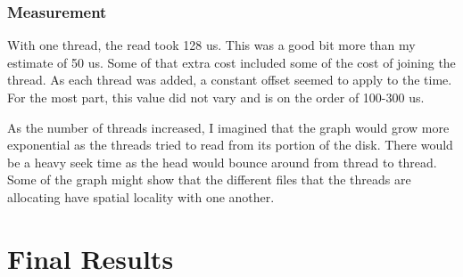 \documentclass[paper=a4, fontsize=11pt]{scrartcl}
\numberwithin{equation}{section}        %
\numberwithin{figure}{section}          %
\numberwithin{table}{section}               %
\begin{document}
\subsubsection{Measurement}

With one thread, the read took 128 us.  This was a good bit more than my estimate of 50 us.  Some of that extra cost included some of the cost of joining the thread.  As each thread was added, a constant offset seemed to apply to the time.  For the most part, this value did not vary and is on the order of 100-300 us.

As the number of threads increased, I imagined that the graph would grow more exponential as the threads tried to read from its portion of the disk.  There would be a heavy seek time as the head would bounce around from thread to thread.  Some of the graph might show that the different files that the threads are allocating have spatial locality with one another.

\begin{center}
\end{center}

\newpage
\section{Final Results}
\end{document}
